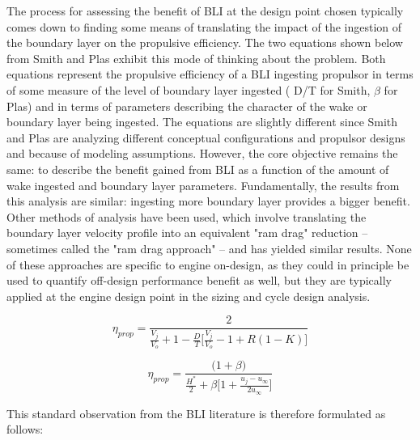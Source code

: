 \documentclass[12pt]{gatech-thesis}
\begin{document}
The process for assessing the benefit of BLI at the design point chosen typically comes down to finding some means of translating the impact of the ingestion of the boundary layer on the propulsive efficiency.  The two equations shown below from Smith and Plas exhibit this mode of thinking about the problem.  Both equations represent the propulsive efficiency of a BLI ingesting propulsor in terms of some measure of the level of boundary layer ingested ( D/T for Smith, $\beta$ for Plas) and in terms of parameters describing the character of the wake or boundary layer being ingested.  The equations are slightly different since Smith and Plas are analyzing different conceptual configurations and propulsor designs and because of modeling assumptions.  However, the core objective remains the same:  to describe the benefit gained from BLI as a function of the amount of wake ingested and boundary layer parameters.  Fundamentally, the results from this analysis are similar:  ingesting more boundary layer provides a bigger benefit.  Other methods of analysis have been used, which involve translating the boundary layer velocity profile into an equivalent "ram drag" reduction -- sometimes called the "ram drag approach" -- and has yielded similar results.  None of these approaches are specific to engine on-design, as they could in principle be used to quantify off-design performance benefit as well, but they are typically applied at the engine design point in the sizing and cycle design analysis.
  
   \begin{equation}\eta_{prop} = \frac{2}{\displaystyle\frac{V_j}{V_o} + 1 - \frac{D}{T}\Big[\displaystyle\frac{V_j}{V_o} -1 + R (1-K)\Big]}  \label{Smith_Propulsive_Efficiency}\end{equation}%

   \begin{equation}\eta_{prop} = \frac{\Big(1+\beta\Big)}
					{\displaystyle \frac{H^*}{2} + \beta\Big[1+\frac{u_j-u_\infty}{2u_\infty}\Big]}\label{Plas_Propulsive_Efficiency}\end{equation}%

\vspace{15pt}
This standard observation from the BLI literature is therefore formulated as follows:

\vspace{1pt}
\vspace{5mm}
\vspace{5mm}
\end{document}
